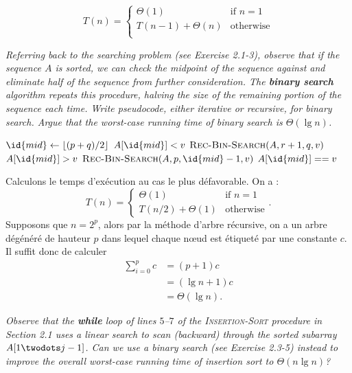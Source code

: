 \begin{description}
\begin{ex}
  \[T(n) = \left\{
    \begin{array}{ll}
    \Theta(1) & \text {if } n = 1\\
      T(n-1) + \Theta(n) & \text{otherwise}\\ 
    \end{array}
  \right.\]
\end{ex}

 {\itshape Referring back to the searching problem (see Exercise 2.1-3), observe that if the sequence $A$ is sorted, we can check the midpoint of the sequence against and eliminate half of the sequence from further consideration. The {\bfseries binary search} algorithm repeats this procedure, halving the size of the remaining portion of the sequence each time. Write pseudocode, either iterative or recursive, for binary
  search. Argue that the worst-case running time of binary search is $\Theta (\lg n)$.}
  \begin{ex}
    \begin{codebox}
      \li $\id{mid} \gets \lfloor(p+q)/2\rfloor$
      \li \If $A[\id{mid}] < v$ \Then
      \li $\textsc{Rec-Bin-Search}(A, r+1, q, v)$ \End
      \li \Else \If $A[\id{mid}] > v$ \Then
      \li  $\textsc{Rec-Bin-Search}(A, p, \id{mid}-1, v)$ \End
      \li \Else \If $A[\id{mid}]  == v$ \Then
      \li \Return {}
      \li \Else 
      \li \Return {} \End
    \end{codebox}

    Calculons le temps d'exécution au cas le plus défavorable. On a :
    \[T(n) = \left\{ 
      \begin{array}{ll}
        \Theta(1) & \text{if } n = 1\\
        T(n/2) + \Theta(1) & \text{otherwise}
      \end{array}
    \right..\]
    Supposons que $n = 2^p$, alors par la méthode d'arbre récursive, on a un arbre dégénéré de hauteur $p$ dans lequel chaque n\oe ud est étiqueté par une constante $c$. Il suffit donc de calculer 
    \begin{align*}
      \sum_{i=0}^{p}c &= (p+1)c\\
     &= (\lg n + 1)c\\
     &= \Theta(\lg n).
    \end{align*}
  \end{ex}

 {\itshape Observe that the {\bfseries while} loop of lines $5$–$7$ of the {\scshape Insertion-Sort} procedure in Section 2.1 uses a linear search to scan (backward) through the sorted subarray $A[1 \twodots j-1]$. Can we use a binary search (see Exercise 2.3-5) instead to improve the overall worst-case running time of insertion sort to $\Theta(n \lg n)$?}


\end{description}
